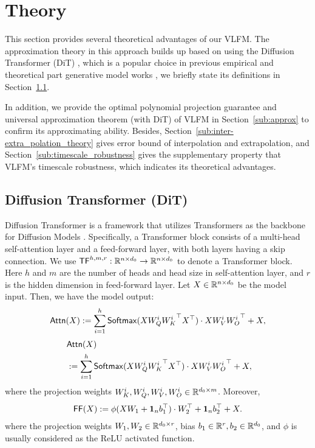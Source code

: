 \section{Theory}\label{sec:theory}

This section provides several theoretical advantages of our VLFM. The approximation theory in this approach builds up based on using the Diffusion Transformer (DiT) \cite{px23}, which is a popular choice in previous empirical and theoretical part generative model works \cite{chzw23, hwsl24}, we briefly state its definitions in Section~\ref{sub:DiT}.

In addition, we provide the optimal polynomial projection guarantee and universal approximation theorem (with DiT) of VLFM in Section~\ref{sub:approx} to confirm its approximating ability. Besides, Section~\ref{sub:inter-extra_polation_theory} gives error bound of interpolation and extrapolation, and Section~\ref{sub:timescale_robustness} gives the supplementary property that VLFM's timescale robustness, which indicates its theoretical advantages.

\subsection{Diffusion Transformer (DiT)}\label{sub:DiT}

Diffusion Transformer \cite{px23} is a framework that utilizes Transformers \cite{vnn+17} as the backbone for Diffusion Models \cite{hja20,sme20}. Specifically, a Transformer block consists of a multi-head self-attention layer and a feed-forward layer, with both layers having a skip connection. 
We use ${\sf TF}^{h, m, r}: \mathbb{R}^{n \times d_0}\rightarrow \mathbb{R}^{n \times d_0}$ to denote a Transformer block.
Here $h$ and $m$ are the number of heads and head size in self-attention layer, and $r$ is the hidden dimension in feed-forward layer.
Let $X \in \mathbb{R}^{n \times d_0}$ be the model input. Then, we have the model output:
\ifdefined\isarxiv
\begin{align*}
    {\sf Attn}(X) := \sum_{i=1}^h {\sf Softmax}( X W_Q^i {W_K^i}^\top X^\top ) \cdot X W_V^i {W_O^i}^\top + X,
\end{align*}
\else
\begin{align*}
    & ~ {\sf Attn}(X) \\
    & ~ := \sum_{i=1}^h {\sf Softmax}( X W_Q^i {W_K^i}^\top X^\top ) \cdot X W_V^i {W_O^i}^\top + X,
\end{align*}
\fi
where the projection weights $W_K^i, W_Q^i, W_V^i, W_O^i \in \mathbb{R}^{d_0 \times m}$. Moreover,
\begin{align*}
    {\sf FF}(X) := \phi(X W_1 + {\bf 1}_n b_1^\top) \cdot W_2^\top + {\bf 1}_n b_2^\top + X.
\end{align*}
where  the projection weights $W_1, W_2 \in \mathbb{R}^{d_0 \times r}$, bias $b_1 \in \mathbb{R}^{r}, b_2 \in \mathbb{R}^{d_0}$, and $\phi$ is usually considered as the ReLU activated function.

